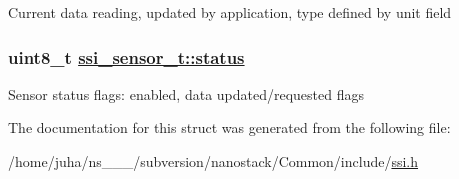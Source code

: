Current data reading, updated by application, type defined by unit field \hypertarget{structssi__sensor__t_3bd3afd85de5f062280f40b14a565328}{
\subsubsection[status]{\setlength{\rightskip}{0pt plus 5cm}uint8\_\-t \hyperlink{structssi__sensor__t_3bd3afd85de5f062280f40b14a565328}{ssi\_\-sensor\_\-t::status}}}
\label{structssi__sensor__t_3bd3afd85de5f062280f40b14a565328}


Sensor status flags: enabled, data updated/requested flags 

The documentation for this struct was generated from the following file:\begin{CompactItemize}
\item 
/home/juha/ns\_\_\_/subversion/nanostack/Common/include/\hyperlink{ssi_8h}{ssi.h}\end{CompactItemize}
